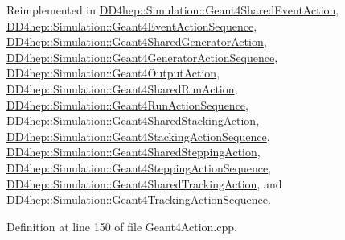Reimplemented in \hyperlink{class_d_d4hep_1_1_simulation_1_1_geant4_shared_event_action_a7933d545b7caacaca3928b3af1038df6}{DD4hep::Simulation::Geant4SharedEventAction}, \hyperlink{class_d_d4hep_1_1_simulation_1_1_geant4_event_action_sequence_a552fac0ec8632b417f81453b4d79e0c4}{DD4hep::Simulation::Geant4EventActionSequence}, \hyperlink{class_d_d4hep_1_1_simulation_1_1_geant4_shared_generator_action_a9ca0ac287c96f37ceaa07740c43e7457}{DD4hep::Simulation::Geant4SharedGeneratorAction}, \hyperlink{class_d_d4hep_1_1_simulation_1_1_geant4_generator_action_sequence_a0ba4324a4f977eb12057e789eaf44f07}{DD4hep::Simulation::Geant4GeneratorActionSequence}, \hyperlink{class_d_d4hep_1_1_simulation_1_1_geant4_output_action_abc1171027ea0a21fedef2d49a14ec557}{DD4hep::Simulation::Geant4OutputAction}, \hyperlink{class_d_d4hep_1_1_simulation_1_1_geant4_shared_run_action_a6077a3ce7deb655ef76d4fe4e8dc1b19}{DD4hep::Simulation::Geant4SharedRunAction}, \hyperlink{class_d_d4hep_1_1_simulation_1_1_geant4_run_action_sequence_adf657c521620857ffed702783c0a2712}{DD4hep::Simulation::Geant4RunActionSequence}, \hyperlink{class_d_d4hep_1_1_simulation_1_1_geant4_shared_stacking_action_af204c8b8ed06b5ac14c168ea639c51ac}{DD4hep::Simulation::Geant4SharedStackingAction}, \hyperlink{class_d_d4hep_1_1_simulation_1_1_geant4_stacking_action_sequence_af292bcae909cc6b7bc4a94c0f0e07b9c}{DD4hep::Simulation::Geant4StackingActionSequence}, \hyperlink{class_d_d4hep_1_1_simulation_1_1_geant4_shared_stepping_action_ae023874861eb3048eba53ef6cd253224}{DD4hep::Simulation::Geant4SharedSteppingAction}, \hyperlink{class_d_d4hep_1_1_simulation_1_1_geant4_stepping_action_sequence_ad5680d2d225421b9cf2cd6b530d3ab5f}{DD4hep::Simulation::Geant4SteppingActionSequence}, \hyperlink{class_d_d4hep_1_1_simulation_1_1_geant4_shared_tracking_action_a7033aa446a1fbce97cf260caaf55b5b2}{DD4hep::Simulation::Geant4SharedTrackingAction}, and \hyperlink{class_d_d4hep_1_1_simulation_1_1_geant4_tracking_action_sequence_afff6a1aeeb049c8ee0ee2819d54b65d0}{DD4hep::Simulation::Geant4TrackingActionSequence}.

Definition at line 150 of file Geant4Action.cpp.

